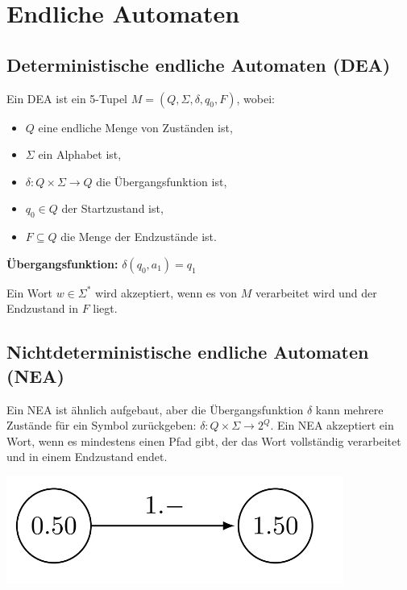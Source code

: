 \documentclass{article}
\begin{document}
\section*{Endliche Automaten}
\begin{minipage}[t]{0.45\textwidth}
    \subsection*{Deterministische endliche Automaten (DEA)}
    Ein DEA ist ein 5-Tupel $M = (Q, \Sigma, \delta, q_0, F)$, wobei:
    \begin{itemize}
        \item $Q$ eine endliche Menge von Zuständen ist,
        \item $\Sigma$ ein Alphabet ist,
        \item $\delta: Q \times \Sigma \to Q$ die Übergangsfunktion ist,
        \item $q_0 \in Q$ der Startzustand ist,
        \item $F \subseteq Q$ die Menge der Endzustände ist.
    \end{itemize}
    \textbf{Übergangsfunktion:} $\delta(q_0, a_1) = q_1$

    Ein Wort $w \in \Sigma^*$ wird akzeptiert, wenn es von $M$ verarbeitet wird und der Endzustand in $F$ liegt.
\end{minipage}
\hfill
\begin{minipage}[t]{0.45\textwidth}
    \subsection*{Nichtdeterministische endliche Automaten (NEA)}
    Ein NEA ist ähnlich aufgebaut, aber die  Übergangsfunktion $\delta$ kann mehrere Zustände für ein Symbol zurückgeben: 
    $\delta: Q \times \Sigma \to 2^Q$. Ein NEA akzeptiert ein Wort, wenn es mindestens einen Pfad gibt, der das Wort vollständig verarbeitet und in einem Endzustand endet.

    \begin{center}
        \includegraphics[scale=0.5]{images/ea.png}
    \end{center}
\end{minipage}
\end{document}

